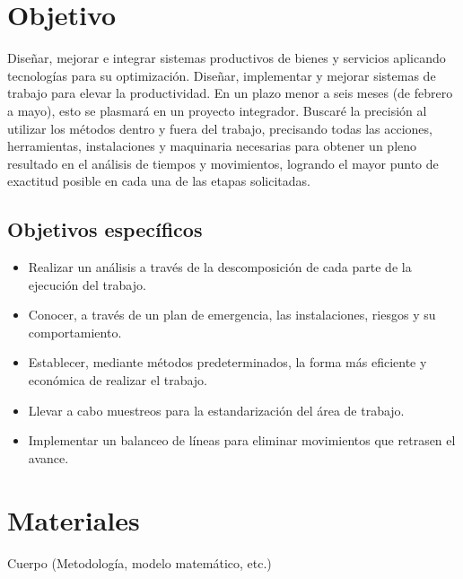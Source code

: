     \section{Objetivo}
    
    Diseñar, mejorar e integrar sistemas productivos de bienes y servicios aplicando tecnologías para su optimización. Diseñar, implementar y mejorar sistemas de trabajo para elevar la productividad. En un plazo menor a seis meses (de febrero a mayo), esto se plasmará en un proyecto integrador. Buscaré la precisión al utilizar los métodos dentro y fuera del trabajo, precisando todas las acciones, herramientas, instalaciones y maquinaria necesarias para obtener un pleno resultado en el análisis de tiempos y movimientos, logrando el mayor punto de exactitud posible en cada una de las etapas solicitadas.
    
    \subsection{Objetivos específicos }
    
    \begin{itemize}
        \item Realizar un análisis a través de la descomposición de cada parte de la ejecución del trabajo.
        \item Conocer, a través de un plan de emergencia, las instalaciones, riesgos y su comportamiento.
        \item Establecer, mediante métodos predeterminados, la forma más eficiente y económica de realizar el trabajo.
        \item Llevar a cabo muestreos para la estandarización del área de trabajo.
        \item Implementar un balanceo de líneas para eliminar movimientos que retrasen el avance.
    
    \end{itemize}
    
    \section{Materiales}
    Cuerpo (Metodología, modelo matemático, etc.)
    
